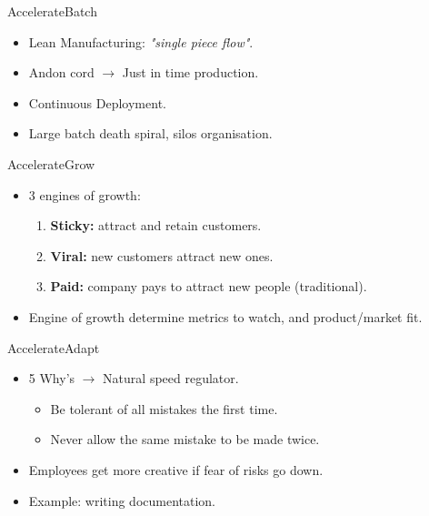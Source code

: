 \documentclass[aspectratio=169]{beamer}
\begin{document}
\begin{frame}{Accelerate}{Batch}
  \begin{itemize}
    \item Lean Manufacturing: \textit{"single piece flow"}.
    \item Andon cord $\rightarrow$ Just in time production.
    \item Continuous Deployment.
    \item Large batch death spiral, silos organisation.
  \end{itemize}
\end{frame}

\begin{frame}{Accelerate}{Grow}
  \begin{itemize}
    \item 3 engines of growth:
      \begin{enumerate}
        \item \textbf{Sticky:} attract and retain customers.
        \item \textbf{Viral:} new customers attract new ones.
        \item \textbf{Paid:} company pays to attract new people (traditional).
      \end{enumerate}
    \item Engine of growth determine metrics to watch, and product/market fit.
  \end{itemize}
\end{frame}


\begin{frame}{Accelerate}{Adapt}
  \begin{itemize}
    \item 5 Why's $\rightarrow$ Natural speed regulator.
      \begin{itemize}
        \item Be tolerant of all mistakes the first time.
        \item Never allow the same mistake to be made twice.
      \end{itemize}
    \item Employees get more creative if fear of risks go down.
    \item Example: writing documentation.
  \end{itemize}
\end{frame}
\end{document}
